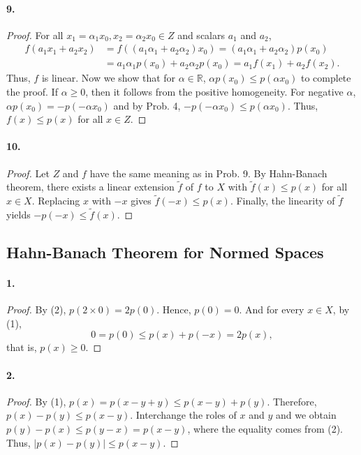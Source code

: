   \paragraph{9.}
  \begin{proof}
    For all $x_1=\alpha_1x_0, x_2=\alpha_2x_0\in Z$ and scalars $a_1$ and $a_2$,
    \begin{align*}
      f(a_1x_1+a_2x_2)&=f((a_1\alpha_1+a_2\alpha_2)x_0)=
      (a_1\alpha_1+a_2\alpha_2)p(x_0) \\
      &=a_1\alpha_1p(x_0)+a_2\alpha_2p(x_0)=a_1f(x_1)+a_2f(x_2).
    \end{align*}
    Thus, $f$ is linear. Now we show that for $\alpha\in\mathbb{R}$, $\alpha p
    (x_0)\le p(\alpha x_0)$ to complete the proof. If $\alpha\ge 0$, then it
    follows from the positive homogeneity. For negative $\alpha$, $\alpha p
    (x_0)=-p(-\alpha x_0)$ and by Prob. 4, $-p(-\alpha x_0)\le p(\alpha x_0)$.
    Thus, $f(x)\le p(x)$ for all $x\in Z$.
  \end{proof}
  
  \paragraph{10.}
  \begin{proof}
    Let $Z$ and $f$ have the same meaning as in Prob. 9. By Hahn-Banach theorem,
    there exists a linear extension $\tilde{f}$ of $f$ to $X$ with $\tilde{f}(x)
    \le p(x)$ for all $x\in X$. Replacing $x$ with $-x$ gives $\tilde{f}(-x)\le
    p(x)$. Finally, the linearity of $\tilde{f}$ yields $-p(-x)\le\tilde{f}(x)$.
  \end{proof}

\subsection{Hahn-Banach Theorem for Normed Spaces}
  \paragraph{1.}
  \begin{proof}
    By (2), $p(2\times 0)=2p(0)$. Hence, $p(0)=0$. And for every $x\in X$, by 
    (1),
    \[
      0=p(0)\le p(x)+p(-x)=2p(x),
    \]
    that is, $p(x)\ge 0$.
  \end{proof}
  
  \paragraph{2.}
  \begin{proof}
    By (1), $p(x)=p(x-y+y)\le p(x-y)+p(y)$. Therefore, $p(x)-p(y)\le p(x-y)$.
    Interchange the roles of $x$ and $y$ and we obtain $p(y)-p(x)\le p(y-x)=
    p(x-y)$, where the equality comes from (2). Thus, $|p(x)-p(y)|\le p(x-y)$.
  \end{proof}
  
